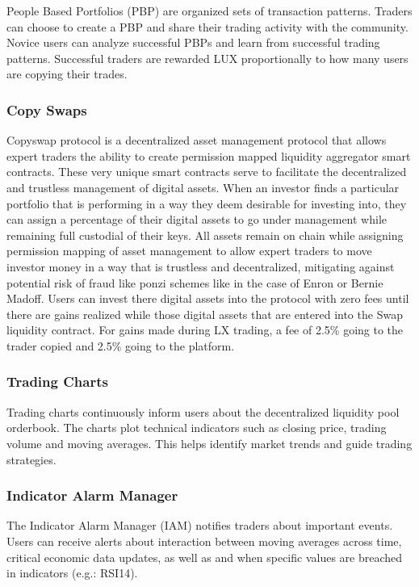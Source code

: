 \documentclass[11pt]{article}
\begin{document}
People Based Portfolios (PBP) are organized sets of transaction patterns. Traders can choose to create a PBP and share their trading activity with the community. Novice users can analyze successful PBPs and learn from successful trading patterns. Successful traders are rewarded LUX proportionally to how many users are copying their trades.


\subsubsection{Copy Swaps}

Copyswap protocol is a decentralized asset management protocol that allows expert traders the ability to create permission mapped liquidity aggregator smart contracts. These very unique smart contracts serve to facilitate the decentralized and trustless management of digital assets.  When an investor finds a particular portfolio that is performing in a way they deem desirable for investing into, they can assign a percentage  of their digital assets to go under management while remaining full custodial of their keys. All assets remain on chain while assigning permission mapping of asset management to allow expert traders to move investor money in a way that is trustless and decentralized, mitigating against potential risk of fraud like ponzi schemes like in the case of Enron or Bernie Madoff. Users can invest there digital assets into the protocol with zero fees until there are gains realized while those digital assets that are entered into the Swap liquidity contract.  For gains made during LX trading, a fee of 2.5\% going to the trader copied and 2.5\% going to the platform.


\subsubsection{Trading Charts}

Trading charts continuously inform users about the decentralized liquidity pool orderbook. The charts plot technical indicators such as closing price, trading volume and moving averages.  This helps identify market trends and guide trading strategies.


\subsubsection{Indicator Alarm Manager}

The Indicator Alarm Manager (IAM) notifies traders about important events. Users can receive alerts about interaction between moving averages across time, critical economic data updates, as well as and when specific values are breached in indicators (e.g.: RSI14).
\end{document}
